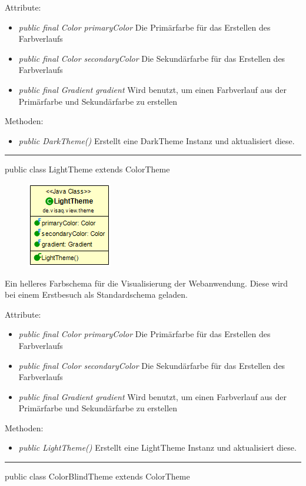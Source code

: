 Attribute:
\begin{itemize}
    \item \emph{public final Color primaryColor} Die Primärfarbe für das Erstellen des Farbverlaufs
    \item \emph{public final Color secondaryColor} Die Sekundärfarbe für das Erstellen des Farbverlaufs
    \item \emph{public final Gradient gradient} Wird benutzt, um einen Farbverlauf aus der Primärfarbe und Sekundärfarbe zu erstellen
\end{itemize}
Methoden:
\begin{itemize} 
    \item \emph{public DarkTheme()} Erstellt eine DarkTheme Instanz und aktualisiert diese.
\end{itemize}

\rule{\textwidth}{0.4pt}
public class LightTheme extends ColorTheme

\begin{minipage}{0.3\textwidth}
    \begin{figure}[H]
        \includegraphics[scale = 0.5]{media/frontend/view/de.view.elements.theme/LightTheme_Class.png}
    \end{figure}
    \end{minipage} \hfill
    \begin{minipage}{0.6\textwidth}
        Ein helleres Farbschema für die Visualisierung der Webanwendung. Diese wird bei einem Erstbesuch als Standardschema geladen.
    \end{minipage}

    Attribute:
    \begin{itemize}
        \item \emph{public final Color primaryColor} Die Primärfarbe für das Erstellen des Farbverlaufs
        \item \emph{public final Color secondaryColor} Die Sekundärfarbe für das Erstellen des Farbverlaufs
        \item \emph{public final Gradient gradient} Wird benutzt, um einen Farbverlauf aus der Primärfarbe und Sekundärfarbe zu erstellen
    \end{itemize}
Methoden:
\begin{itemize} 
    \item \emph{public LightTheme()} Erstellt eine LightTheme Instanz und aktualisiert diese.
\end{itemize}
\clearpage %
\rule{\textwidth}{0.4pt}
public class ColorBlindTheme extends ColorTheme


